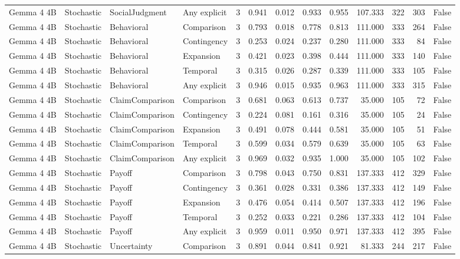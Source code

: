 \begin{tabular}{llllrrrrrrrrr}
Gemma 4 4B & Stochastic & SocialJudgment & Any explicit & 3 & 0.941 & 0.012 & 0.933 & 0.955 & 107.333 & 322 & 303 & False \\
Gemma 4 4B & Stochastic & Behavioral & Comparison & 3 & 0.793 & 0.018 & 0.778 & 0.813 & 111.000 & 333 & 264 & False \\
Gemma 4 4B & Stochastic & Behavioral & Contingency & 3 & 0.253 & 0.024 & 0.237 & 0.280 & 111.000 & 333 & 84 & False \\
Gemma 4 4B & Stochastic & Behavioral & Expansion & 3 & 0.421 & 0.023 & 0.398 & 0.444 & 111.000 & 333 & 140 & False \\
Gemma 4 4B & Stochastic & Behavioral & Temporal & 3 & 0.315 & 0.026 & 0.287 & 0.339 & 111.000 & 333 & 105 & False \\
Gemma 4 4B & Stochastic & Behavioral & Any explicit & 3 & 0.946 & 0.015 & 0.935 & 0.963 & 111.000 & 333 & 315 & False \\
Gemma 4 4B & Stochastic & ClaimComparison & Comparison & 3 & 0.681 & 0.063 & 0.613 & 0.737 & 35.000 & 105 & 72 & False \\
Gemma 4 4B & Stochastic & ClaimComparison & Contingency & 3 & 0.224 & 0.081 & 0.161 & 0.316 & 35.000 & 105 & 24 & False \\
Gemma 4 4B & Stochastic & ClaimComparison & Expansion & 3 & 0.491 & 0.078 & 0.444 & 0.581 & 35.000 & 105 & 51 & False \\
Gemma 4 4B & Stochastic & ClaimComparison & Temporal & 3 & 0.599 & 0.034 & 0.579 & 0.639 & 35.000 & 105 & 63 & False \\
Gemma 4 4B & Stochastic & ClaimComparison & Any explicit & 3 & 0.969 & 0.032 & 0.935 & 1.000 & 35.000 & 105 & 102 & False \\
Gemma 4 4B & Stochastic & Payoff & Comparison & 3 & 0.798 & 0.043 & 0.750 & 0.831 & 137.333 & 412 & 329 & False \\
Gemma 4 4B & Stochastic & Payoff & Contingency & 3 & 0.361 & 0.028 & 0.331 & 0.386 & 137.333 & 412 & 149 & False \\
Gemma 4 4B & Stochastic & Payoff & Expansion & 3 & 0.476 & 0.054 & 0.414 & 0.507 & 137.333 & 412 & 196 & False \\
Gemma 4 4B & Stochastic & Payoff & Temporal & 3 & 0.252 & 0.033 & 0.221 & 0.286 & 137.333 & 412 & 104 & False \\
Gemma 4 4B & Stochastic & Payoff & Any explicit & 3 & 0.959 & 0.011 & 0.950 & 0.971 & 137.333 & 412 & 395 & False \\
Gemma 4 4B & Stochastic & Uncertainty & Comparison & 3 & 0.891 & 0.044 & 0.841 & 0.921 & 81.333 & 244 & 217 & False \\

\end{tabular}

